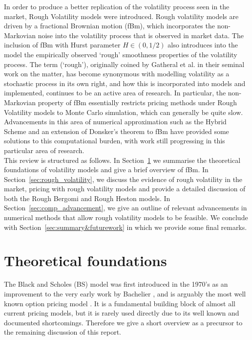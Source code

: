 \documentclass[12pt,oneside]{article}
\begin{document}
In order to produce a better replication of the volatility process seen in the market, Rough Volatility models were introduced. Rough volatility models are driven by a fractional Brownian motion (fBm), which incorporates the non-Markovian noise into the volatility process that is observed in market data. The inclusion of fBm with Hurst parameter $H\in(0,1/2)$ also introduces into the model the empirically observed `rough' smoothness properties of the volatility process. The term (`rough'), originally coined by Gatheral et al.\cite{Gatheral2014} in their seminal work on the matter, has become synonymous with modelling volatility as a stochastic process in its own right, and how this is incorporated into models and implemented, continues to be an active area of research. In particular, the non-Markovian property of fBm essentially restricts pricing methods under Rough Volatility models to Monte Carlo simulation, which can generally be quite slow. Advancements in this area of numerical approximation such as the Hybrid Scheme \cite{Bennedsen2017} and an extension of Donsker's theorem to fBm \cite{Horvath2017} have provided some solutions to this computational burden, with work still progressing in this particular area of research.
\\

This review is structured as follows. In Section~\ref{sec:black_scholes_foundations} we summarise the theoretical foundations of volatility models and give a brief overview of fBm. In Section~\ref{sec:rough_volatility}, we discuss the evidence of rough volatility in the market, pricing with rough volatility models and provide a detailed discussion of both the Rough Bergomi and Rough Heston models. In Section~\ref{sec:comp_advancement}, we give an outline of relevant advancements in numerical methods that allow rough volatility models to be feasible. We conclude with Section~\ref{sec:summary&futurework} in which we provide some final remarks.

\section{Theoretical foundations}
\label{sec:black_scholes_foundations}

The Black and Scholes (BS) model was first introduced in the 1970's as an improvement to the very early work by Bachelier \cite{Bachelier1900}, and is arguably the most well known option pricing model \cite{BlackScholes1973}. It is a fundamental building block of almost all current pricing models, but it is rarely used directly due to its well known and documented shortcomings. Therefore we give a short overview as a precursor to the remaining discussion of this report.
\\
\end{document}
